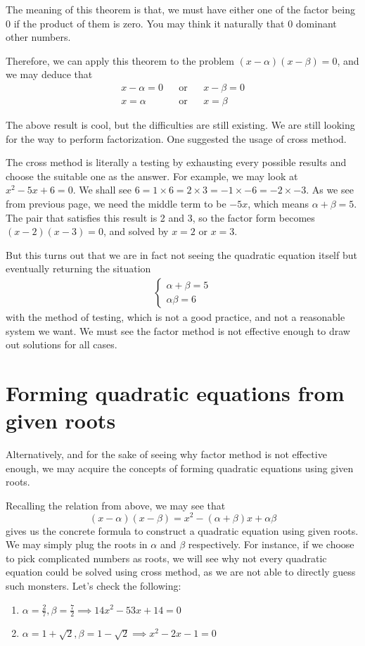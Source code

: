 \documentclass[12pt]{article}
\begin{document}
    The meaning of this theorem is that, we must have either one of the factor being 0 if the product of them is zero. You may think it naturally that 0 dominant other numbers.

    Therefore, we can apply this theorem to the problem $(x-\alpha)(x-\beta)=0$, and we may deduce that 
    \begin{align*}
        x-\alpha=0&&\textrm{or}&&x-\beta=0\\
        x=\alpha&&\textrm{or}&&x=\beta
    \end{align*}

    The above result is cool, but the difficulties are still existing. We are still looking for the way to perform factorization. One suggested the usage of cross method.

    The cross method is literally a testing by exhausting every possible results and choose the suitable one as the answer. For example, we may look at $x^2-5x+6=0$. We shall see $6=1\times 6=2\times 3=-1\times -6=-2\times -3$. As we see from previous page, we need the middle term to be $-5x$, which means $\alpha+\beta=5$. The pair that satisfies this result is 2 and 3, so the factor form becomes $(x-2)(x-3)=0$, and solved by $x=2$ or $x=3$.

    But this turns out that we are in fact not seeing the quadratic equation itself but eventually returning the situation 
    \begin{align*}
        \begin{cases}
            \alpha+\beta=5\\
            \alpha\beta=6
        \end{cases}
    \end{align*}
    with the method of testing, which is not a good practice, and not a reasonable system we want. We must see the factor method is not effective enough to draw out solutions for all cases. 

    \section*{Forming quadratic equations from given roots}
    Alternatively, and for the sake of seeing why factor method is not effective enough, we may acquire the concepts of forming quadratic equations using given roots.

    Recalling the relation from above, we may see that $$(x-\alpha)(x-\beta)=x^2-(\alpha+\beta)x+\alpha\beta$$ gives us the concrete formula to construct a quadratic equation using given roots. We may simply plug the roots in $\alpha$ and $\beta$ respectively. For instance, if we choose to pick complicated numbers as roots, we will see why not every quadratic equation could be solved using cross method, as we are not able to directly guess such monsters. Let's check the following:
    \begin{enumerate}
        \item $\alpha=\frac{2}{7}, \beta=\frac{7}{2}\implies 14x^2-53x+14=0$
        \item $\alpha=1+\sqrt{2}, \beta=1-\sqrt{2}\implies x^2-2x-1=0$
    \end{enumerate}
    
\end{document}
